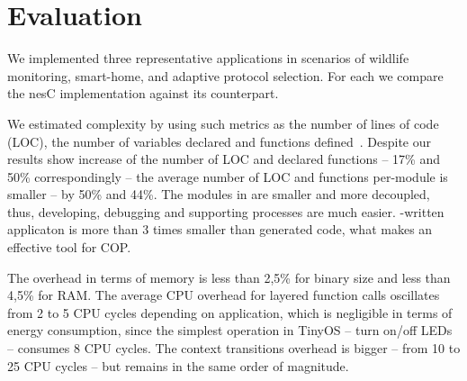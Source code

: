 \section{Evaluation}\label{sec:eval}

We implemented three representative applications in scenarios of wildlife
monitoring, smart-home, and adaptive protocol selection. For each we compare
the nesC implementation against its \conesc counterpart.

We estimated complexity by using such metrics as the number of lines of code
(LOC), the number of variables declared and functions defined~\cite{Pressman01}.
Despite our results show increase of the number of LOC and declared functions --
17\% and 50\% correspondingly -- the average number of LOC and functions
per-module is smaller -- by 50\% and 44\%. The modules in \conesc are smaller
and more decoupled, thus, developing, debugging and supporting processes are
much easier. \conesc-written applicaton is more than 3 times smaller than
generated code, what makes \conesc an effective tool for COP.

The overhead in terms of memory is less than 2,5\% for binary size and less than
4,5\% for RAM. The average CPU overhead for layered function calls oscillates
from 2 to 5 CPU cycles depending on application, which is negligible in terms of
energy consumption, since the simplest operation in TinyOS -- turn on/off LEDs
-- consumes 8 CPU cycles. The context transitions overhead is bigger -- from 10
to 25 CPU cycles -- but remains in the same order of magnitude.
